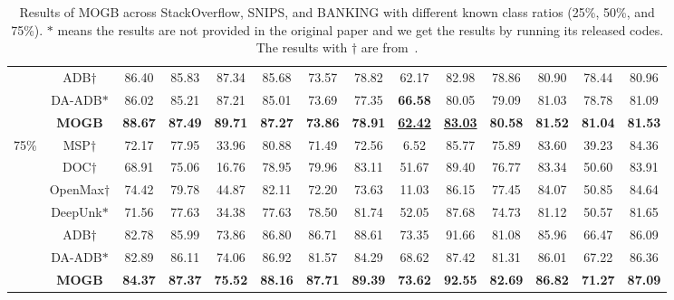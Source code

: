 \documentclass[letterpaper]{article} %
\theoremstyle{definition}
\begin{document}
\begin{table}[t]
\begin{tabular}{lc|cccc|cccc|cccc}
&ADB$\dagger$& 86.40    & 85.83  & 87.34   & 85.68&73.57      &78.82    &62.17     &82.98       & 78.86    & 80.90     & 78.44  & 80.96   \\
& DA-ADB$\ast$ & 86.02& 85.21& 87.21& 85.01& 73.69& 77.35& \textbf{66.58}& 80.05& 79.09& 81.03& 78.78&81.09\\
&\textbf{MOGB} &\textbf{88.67} &\textbf{87.49} &\textbf{89.71} &\textbf{87.27}&\textbf{73.86}&\textbf{78.91} & \underline{\textbf{62.42}}&\underline{\textbf{83.03}}  & \textbf{80.58}& \textbf{81.52}&\textbf{81.04} &\textbf{81.53}\\
                      \hline
                    

\multirow{7}{*}{75\%} &MSP$\dagger$& 72.17    & 77.95   & 33.96   & 80.88   &71.49     &72.56     &6.52     &85.77      & 75.89    & 83.60  & 39.23  & 84.36  \\
&DOC$\dagger$& 68.91    & 75.06   & 16.76   & 78.95&79.96     &83.11      & 51.67    &89.40   & 76.77    & 83.34  & 50.60  & 83.91   \\
&OpenMax$\dagger$& 
74.42    & 79.78    & 44.87   & 82.11&72.20     &73.63   &11.03     &86.15         & 77.45    & 84.07  & 50.85  & 84.64 \\
& DeepUnk$\ast$ & 71.56& 77.63& 34.38& 77.63 & 78.50& 81.74& 52.05& 87.68& 74.73& 81.12& 50.57&81.65\\

 &ADB$\dagger$ & 82.78    & 85.99    & 73.86   & 86.80&86.71     &88.61   &73.35      &91.66        & 81.08& 85.96&66.47& 86.09\\
& DA-ADB$\ast$ & 82.89& 86.11& 74.06& 86.92& 81.57& 84.29& 68.62& 87.42& 81.31& 86.01& 67.22&86.36\\ 
&\textbf{MOGB}   &\textbf{84.37} &\textbf{87.37}&\textbf{75.52} &\textbf{88.16}&\textbf{87.71} & \textbf{89.39} &\textbf{73.62} &\textbf{92.55}& \textbf{82.69} & \textbf{86.82}  & \textbf{71.27}  &\textbf{87.09} \\
                       \hline
\end{tabular}
\caption{Results of MOGB across StackOverflow, SNIPS, and BANKING with different known class ratios (25\%, 50\%, and 75\%). $\ast$ means the results are not provided in the original paper and we get the results by running its released codes.
The results with $\dagger$ are from~\cite{zhang2021deep}.}
\label{tab:2}
\end{table}
\end{document}
